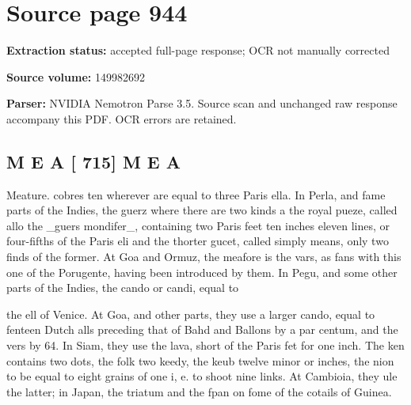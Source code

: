\clearpage
\section{Source page 944}
\textbf{Extraction status:} accepted full-page response; OCR not manually corrected\par
\textbf{Source volume:} 149982692\par
\textbf{Parser:} NVIDIA Nemotron Parse 3.5. Source scan and unchanged raw response accompany this PDF. OCR errors are retained.\par\medskip
\subsection*{M E A [ 715] M E A}
Meature. cobres ten wherever are equal to three Paris ella. In Perla, and fame parts of the Indies, the guerz where there are two kinds a the royal pueze, called allo the \_guers mondifer\_, containing two Paris feet ten inches eleven lines, or four-fifths of the Paris eli and the thorter gucet, called simply means, only two finds of the former. At Goa and Ormuz, the meafore is the vars, as fans with this one of the Porugente, having been introduced by them. In Pegu, and some other parts of the Indies, the cando or candi, equal to\par\medskip
the ell of Venice. At Goa, and other parts, they use a larger cando, equal to fenteen Dutch alls preceding that of Bahd and Ballons by a par centum, and the vers by 64. In Siam, they use the lava, short of the Paris fet for one inch. The ken contains two dots, the folk two keedy, the keub twelve minor or inches, the nion to be equal to eight grains of one i, e. to shoot nine links. At Cambioia, they ule the latter; in Japan, the triatum and the fpan on fome of the cotails of Guinea.\par\medskip
